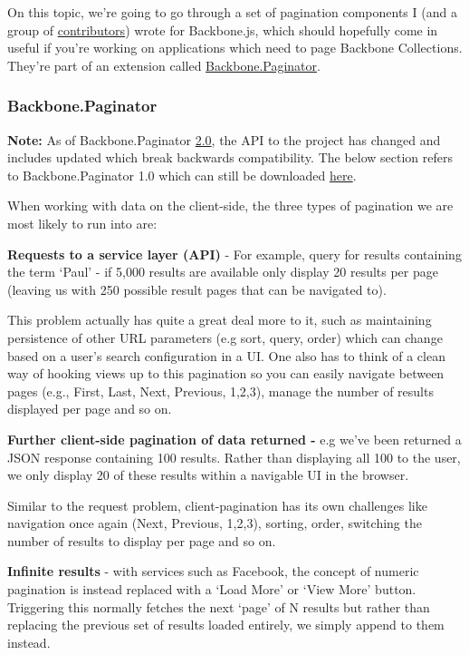 \documentclass[9pt]{book}
\begin{document}
On this topic, we're going to go through a set of pagination components
I (and a group of
\href{https://github.com/addyosmani/backbone.paginator/contributors}{contributors})
wrote for Backbone.js, which should hopefully come in useful if you're
working on applications which need to page Backbone Collections. They're
part of an extension called
\href{http://github.com/addyosmani/backbone.paginator}{Backbone.Paginator}.

\subsubsection{Backbone.Paginator}\label{backbone.paginator}

\textbf{Note:} As of Backbone.Paginator
\href{https://github.com/backbone-paginator/backbone.paginator/releases}{2.0},
the API to the project has changed and includes updated which break
backwards compatibility. The below section refers to Backbone.Paginator
1.0 which can still be downloaded
\href{https://github.com/backbone-paginator/backbone.paginator/releases/tag/v1.0.0}{here}.

When working with data on the client-side, the three types of pagination
we are most likely to run into are:

\textbf{Requests to a service layer (API)} - For example, query for
results containing the term `Paul' - if 5,000 results are available only
display 20 results per page (leaving us with 250 possible result pages
that can be navigated to).

This problem actually has quite a great deal more to it, such as
maintaining persistence of other URL parameters (e.g sort, query, order)
which can change based on a user's search configuration in a UI. One
also has to think of a clean way of hooking views up to this pagination
so you can easily navigate between pages (e.g., First, Last, Next,
Previous, 1,2,3), manage the number of results displayed per page and so
on.

\textbf{Further client-side pagination of data returned -} e.g we've
been returned a JSON response containing 100 results. Rather than
displaying all 100 to the user, we only display 20 of these results
within a navigable UI in the browser.

Similar to the request problem, client-pagination has its own challenges
like navigation once again (Next, Previous, 1,2,3), sorting, order,
switching the number of results to display per page and so on.

\textbf{Infinite results} - with services such as Facebook, the concept
of numeric pagination is instead replaced with a `Load More' or `View
More' button. Triggering this normally fetches the next `page' of N
results but rather than replacing the previous set of results loaded
entirely, we simply append to them instead.
\end{document}
